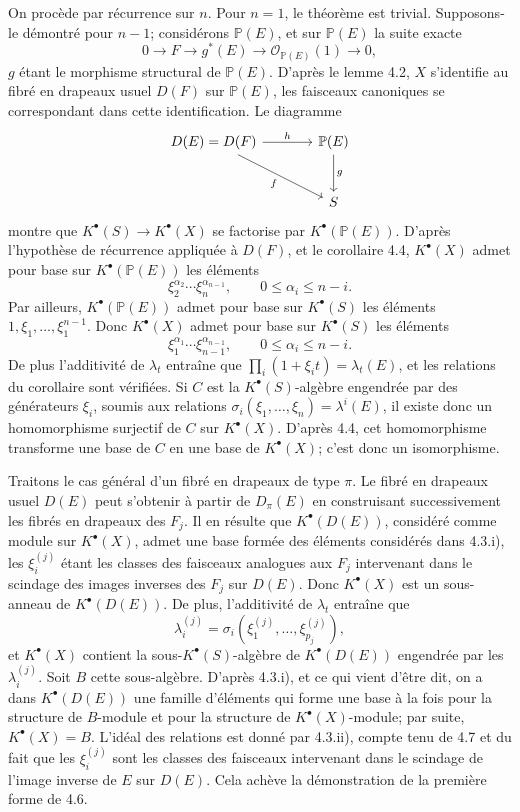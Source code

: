 \documentclass[11pt]{article}
\begin{document}
On procède par récurrence sur \(n\). Pour \(n=1\), le théorème est trivial. Supposons-le démontré pour \(n-1\); considérons \(\mathbb P(E)\), et sur \(\mathbb P(E)\) la suite exacte
\[
  0\longrightarrow F\longrightarrow g^*(E)\longrightarrow \mathcal O_{\mathbb P(E)}(1)\longrightarrow 0,
\]
\(g\) étant le morphisme structural de \(\mathbb P(E)\). D'après le lemme 4.2, \(X\) s'identifie au fibré en drapeaux usuel \(D(F)\) sur \(\mathbb P(E)\), les faisceaux canoniques se correspondant dans cette identification. Le diagramme
\[
\begin{tikzcd}[column sep=large,row sep=large]
D(E)=D(F) \arrow[r,"h"] \arrow[dr,"f"'] & \mathbb P(E) \arrow[d,"g"]\\
& S
\end{tikzcd}
\]
montre que \(K^\bullet(S)\to K^\bullet(X)\) se factorise par \(K^\bullet(\mathbb P(E))\). D'après l'hypothèse de récurrence appliquée à \(D(F)\), et le corollaire 4.4, \(K^\bullet(X)\) admet pour base sur \(K^\bullet(\mathbb P(E))\) les éléments
\[
  \xi_2^{\alpha_2}\cdots\xi_n^{\alpha_{n-1}},
  \qquad 0\le\alpha_i\le n-i.
\]
Par ailleurs, \(K^\bullet(\mathbb P(E))\) admet pour base sur \(K^\bullet(S)\) les éléments \(1,\xi_1,\ldots,\xi_1^{n-1}\). Donc \(K^\bullet(X)\) admet pour base sur \(K^\bullet(S)\) les éléments
\[
  \xi_1^{\alpha_1}\cdots\xi_{n-1}^{\alpha_{n-1}},
  \qquad 0\le\alpha_i\le n-i.
\]
De plus l'additivité de \(\lambda_t\) entraîne que \(\prod_i(1+\xi_i t)=\lambda_t(E)\), et les relations du corollaire sont vérifiées. Si \(C\) est la \(K^\bullet(S)\)-algèbre engendrée par des générateurs \(\xi_i\), soumis aux relations \(\sigma_i(\xi_1,\ldots,\xi_n)=\lambda^i(E)\), il existe donc un homomorphisme surjectif de \(C\) sur \(K^\bullet(X)\). D'après 4.4, cet homomorphisme transforme une base de \(C\) en une base de \(K^\bullet(X)\); c'est donc un isomorphisme.

Traitons le cas général d'un fibré en drapeaux de type \(\pi\). Le fibré en drapeaux usuel \(D(E)\) peut s'obtenir à partir de \(D_\pi(E)\) en construisant successivement les fibrés en drapeaux des \(F_j\). Il en résulte que \(K^\bullet(D(E))\), considéré comme module sur \(K^\bullet(X)\), admet une base formée des éléments considérés dans 4.3.i), les \(\xi_i^{(j)}\) étant les classes des faisceaux analogues aux \(F_j\) intervenant dans le scindage des images inverses des \(F_j\) sur \(D(E)\). Donc \(K^\bullet(X)\) est un sous-anneau de \(K^\bullet(D(E))\). De plus, l'additivité de \(\lambda_t\) entraîne que
\[
  \lambda_i^{(j)}=\sigma_i(\xi_1^{(j)},\ldots,\xi_{p_j}^{(j)}),
\]
et \(K^\bullet(X)\) contient la sous-\(K^\bullet(S)\)-algèbre de \(K^\bullet(D(E))\) engendrée par les \(\lambda_i^{(j)}\). Soit \(B\) cette sous-algèbre. D'après 4.3.i), et ce qui vient d'être dit, on a dans \(K^\bullet(D(E))\) une famille d'éléments qui forme une base à la fois pour la structure de \(B\)-module et pour la structure de \(K^\bullet(X)\)-module; par suite, \(K^\bullet(X)=B\). L'idéal des relations est donné par 4.3.ii), compte tenu de 4.7 et du fait que les \(\xi_i^{(j)}\) sont les classes des faisceaux intervenant dans le scindage de l'image inverse de \(E\) sur \(D(E)\). Cela achève la démonstration de la première forme de 4.6.
\end{document}
